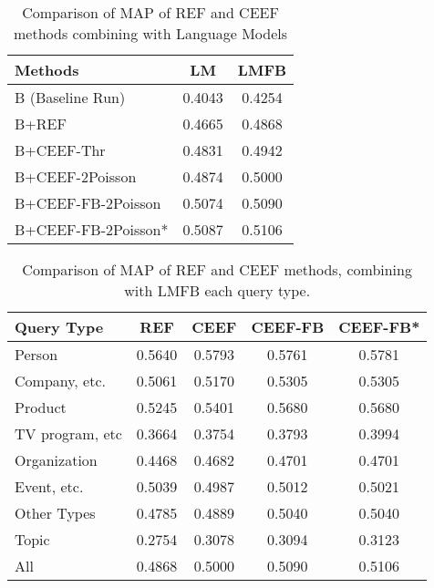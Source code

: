 \begin{table}[h]
	\centering
	\begin{tabular}{lS[tabnumalign=centre,tabformat=1.4,decimalsymbol=comma]S[tabnumalign=centre,tabformat=1.4,decimalsymbol=comma]}
		\toprule
		Methods & {LM} & {LMFB} \\
		\midrule
		B (Baseline Run) & 0.4043 & 0.4254 \\
		B+REF & 0.4665 & 0.4868 \\
		B+CEEF-Thr & 0.4831 & 0.4942 \\
		B+CEEF-2Poisson & 0.4874 & 0.5000 \\
		B+CEEF-FB-2Poisson & 0.5074 & 0.5090 \\
		B+CEEF-FB-2Poisson* & 0.5087 & 0.5106 \\
		\bottomrule
	\end{tabular}
	\caption{Comparison of MAP of REF and CEEF methods combining with Language Models}
	\cite{paper:Na}
\end{table}




\begin{table}[h]
	\centering
		\begin{tabular}{lS[tabnumalign=centre,tabformat=1.4,decimalsymbol=comma]S[tabnumalign=centre,tabformat=1.4,decimalsymbol=comma]S[tabnumalign=centre,tabformat=1.4,decimalsymbol=comma]S[tabnumalign=centre,tabformat=1.4,decimalsymbol=comma]}
			\toprule
			Query Type & {REF} & {CEEF} & {CEEF-FB} & {CEEF-FB*}\\
			\midrule
			Person & 0.5640 & 0.5793 & 0.5761 & 0.5781\\
			Company, etc. & 0.5061 & 0.5170 & 0.5305 & 0.5305\\
			Product & 0.5245 & 0.5401 & 0.5680 & 0.5680\\
			TV program, etc & 0.3664 & 0.3754 & 0.3793 & 0.3994\\
			Organization & 0.4468 & 0.4682 & 0.4701 & 0.4701\\
			Event, etc. & 0.5039 & 0.4987 & 0.5012 & 0.5021\\
			Other Types & 0.4785 & 0.4889 & 0.5040 & 0.5040\\
			Topic & 0.2754 & 0.3078 & 0.3094 & 0.3123\\
			All & 0.4868 & 0.5000 & 0.5090 & 0.5106\\
			\bottomrule
		\end{tabular}
		\caption{Comparison of MAP of REF and CEEF methods, combining with LMFB each query type.\cite{paper:Na}}
\end{table}









